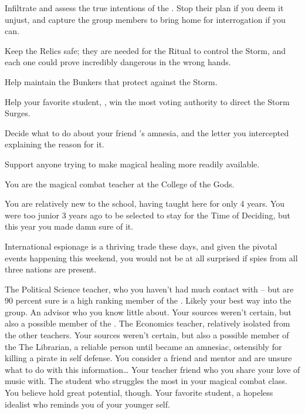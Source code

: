 \documentclass[char]{GL2020}
\begin{document}
\begin{itemz}
	\item Infiltrate and assess the true intentions of the \pGoaties{}. Stop their plan if you deem it unjust, and capture the group members to bring home for interrogation if you can.
	\item Keep the Relics safe; they are needed for the Ritual to control the Storm, and each one could prove incredibly dangerous in the wrong hands.
	\item Help \cBunker{} maintain the Bunkers that protect against the Storm.
	\item Help your favorite student, \cDisney{}, win the most voting authority to direct the Storm Surges.
\item Decide what to do about your friend \cLibrarian{}'s amnesia, and the letter you intercepted explaining the reason for it.
	\item Support anyone trying to make magical healing more readily available.
\end{itemz}

\begin{itemz}[Notes]
	\item You are the magical combat teacher at the College of the Gods.
	\item You are relatively new to the school, having taught here for only 4 years. You were too junior 3 years ago to be selected to stay for the Time of Deciding, but this year you made damn sure of it.
	\item International espionage is a thriving trade these days, and given the pivotal events happening this weekend, you would not be at all surprised if spies from all three nations are present. 
\end{itemz}

\begin{contacts}
	\contact{\cChupInventor{}} The Political Science teacher, who you haven't had much contact with -- but are 90 percent sure is a high ranking member of the \pGoaties{}. Likely your best way into the group.
\contact{\cWildCard{}} An advisor who you know little about. Your sources weren't certain, but also a possible member of the \pGoaties{}. 
	\contact{\cChupSecond{}} The Economics teacher, relatively isolated from the other teachers. Your sources weren't certain, but also a possible member of the \pGoaties{}
	\contact{\cLibrarian{}} The Librarian, a reliable person until \cLibrarian{\they} became an amnesiac, ostensibly for killing a pirate in self defense. You consider \cLibrarian{\them} a friend and mentor and are unsure what to do with this information\ldots{}
	\contact{\cMusic{}} Your teacher friend who you share your love of music with.
	\contact{\cAdopted{}} The student who struggles the most in your magical combat class. You believe \cAdopted{\they} hold great potential, though.
	\contact{\cDisney{}} Your favorite student, a hopeless idealist who reminds you of your younger self. 
\end{contacts}
\end{document}
